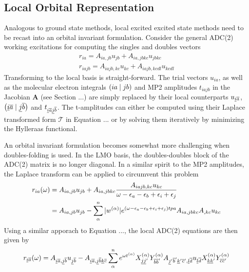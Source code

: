 \subsection{Local Orbital Representation}

Analogous to ground state methods, local excited excited state methods need to be recast into an orbital invariant formulation. Consider the general ADC(2) working excitations for computing the singles and doubles vectors
\begin{equation}
\begin{split}
r_{ia} = A_{ia,jb} u_{jb} + A_{ia,jbkc} u_{jbkc} \\
r_{iajb} = A_{iajb,kc} u_{kc} + A_{iajb,kcdl} u_{kcdl}
\end{split}
\end{equation}
\noindent Transforming to the local basis is straight-forward. The trial vectors $u_{ia}$, as well as the molecular electron integrals $\left( ia \mid jb \right)$ and MP2 amplitudes $t_{iajb}$ in the Jacobian $\mathbf{A}$ (see Section ...) are simply replaced by their local counterparts $u_{\underline{i}\overline{a}}$, $\left( \underline{i}\overline{a} \mid \underline{j}\overline{b} \right)$ and $t_{\underline{i}\overline{a}\underline{j}\overline{b}}$. The t-amplitudes can either be computed using their Laplace transformed form $\mathcal{T}$ in Equation ... or by solving them iteratively by minimizing the Hylleraas functional.

An orbital invariant formulation becomes somewhat more challenging when doubles-folding is used. In the LMO basis, the doubles-doubles block of the ADC(2) matrix is no longer diagonal. In a similar spirit to the MP2 amplitudes, the Laplace transform can be applied to circumvent this problem
\begin{equation}
\begin{split}
r_{ia}(\omega) &= A_{ia,jb} u_{jb} + A_{ia,jbkc} \frac{A_{iajb,kc} u_{kc}}{\omega - \epsilon_a - \epsilon_b + \epsilon_i + \epsilon_j} \\
&= A_{ia,jb} u_{jb} - \sum_{\alpha}^{n} |w^{(\alpha)}| e^{\left(\omega - \epsilon_a - \epsilon_b + \epsilon_i + \epsilon_j\right) tpa} A_{ia,jbkc} A_{,kc} u_{kc} 
\end{split}
\end{equation}
Using a similar apporach to Equation ..., the local ADC(2) equations are then given by 
\begin{equation}
r_{\underline{i} \overline{a}}(\omega) = A_{\underline{i} \overline{a}, \underline{j} \overline{b}} u_{\underline{j} \overline{b}} - A_{\underline{i} \overline{a}, \underline{j} \overline{b} \underline{k} \overline{c}} \sum_{\alpha}^{n} e^{\omega t^{(\alpha)}} X_{\underline{j} \underline{j}'}^{(\alpha)} Y_{\overline{b} \overline{b}'}^{(\alpha)} A_{\underline{j}' \overline{b}' \underline{k}' \overline{c}', \underline{l} \overline{d}} u_{\underline{l} \overline{d}} X_{\underline{k} \underline{k}'}^{(\alpha)} Y_{\overline{c} \overline{c}'}^{(\alpha)}  \\
\end{equation}


